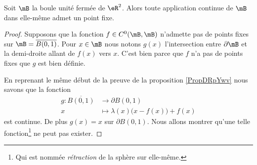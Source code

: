 \begin{theorem}     \label{ThoLVViheK}
    Soit \( \mB\) la boule unité fermée de \( \eR^2\). Alors toute application continue de \( \mB\) dans elle-même admet un point fixe.
\end{theorem}

\begin{proof}
    Supposons que la fonction \( f\in C^0(\mB,\mB)\) n'admette pas de points fixes sur \( \mB=\overline{ B(0,1) }\). Pour \( x\in \mB\) nous notons \( g(x)\) l'intersection entre \( \partial \mB\) et la demi-droite allant de \( f(x)\) vers \( x\). C'est bien parce que \( f\) n'a pas de points fixes que \( g\) est bien définie.

    En reprenant le même début de la preuve de la proposition \ref{PropDRpYwv} nous savons que la fonction
    \begin{equation}
        \begin{aligned}
            g\colon \overline{ B(0,1) }&\to \partial B(0,1) \\
            x&\mapsto \lambda(x)\big( x-f(x) \big)+f(x) 
        \end{aligned}
    \end{equation}
    est continue. De plus \( g(x)=x\) sur \( \partial B(0,1)\). Nous allons montrer qu'une telle fonction\footnote{Qui est nommée \emph{rétraction} de la sphère sur elle-même.} ne peut pas exister.


\end{proof}
